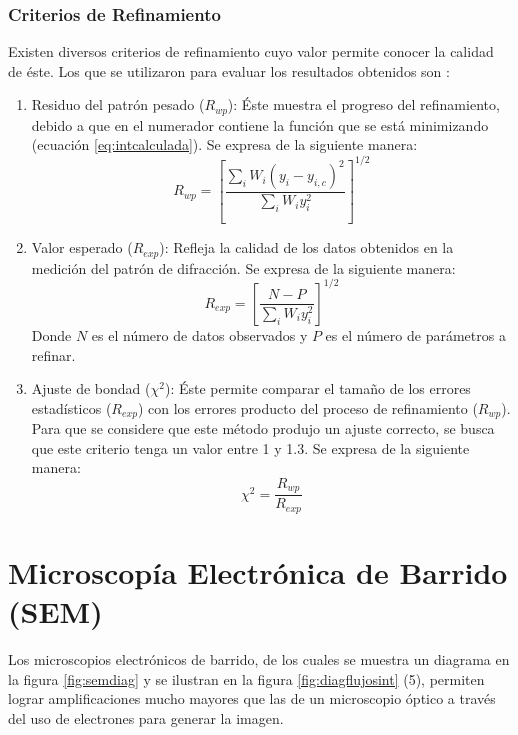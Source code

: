 \documentclass[../main.tex]{subfiles}
\begin{document}
\subsubsection{Criterios de Refinamiento} \label{sec:refinamiento}
Existen diversos criterios de refinamiento cuyo valor permite conocer la calidad de éste. Los que se utilizaron para evaluar los resultados obtenidos son \cite{Rietveld}:
\begin{enumerate}[label=\textbf{\alph*)}]
    \item Residuo del patrón pesado ($R_{wp}$): Éste muestra el progreso del refinamiento, debido a que en el numerador contiene la función que se está minimizando (ecuación \ref{eq:intcalculada}). Se expresa de la siguiente manera:
    \begin{equation}
        R_{wp}=\left[\dfrac{\sum_i W_i\left(y_i-y_{i,c}\right)^2}{\sum_i W_i y_i^2}\right]^{1/2}
        \label{eq:patronpesado}
    \end{equation}
    \item Valor esperado ($R_{exp}$): Refleja la calidad de los datos obtenidos en la medición del patrón de difracción. Se expresa de la siguiente manera:
    \begin{equation}
        R_{exp}=\left[\dfrac{N-P}{\sum_i W_i y_i^2}\right]^{1/2}
        \label{eq:valoresperado}
    \end{equation}
    Donde $N$ es el número de datos observados y $P$ es el número de parámetros a refinar.
    \item Ajuste de bondad ($\chi^2$): Éste permite comparar el tamaño de los errores estadísticos ($R_{exp}$) con los errores producto del proceso de refinamiento ($R_{wp}$). Para que se considere que este método produjo un ajuste correcto, se busca que este criterio tenga un valor entre 1 y 1.3. Se expresa de la siguiente manera:
    \begin{equation}
        \chi^2=\dfrac{R_{wp}}{R_{exp}}
        \label{eq:ajustebondad}
    \end{equation}
\end{enumerate}
\section{Microscopía Electrónica de Barrido (SEM)} \label{sec:metodologiaSEM}
Los microscopios electrónicos de barrido, de los cuales se muestra un diagrama en la figura \ref{fig:semdiag} y se ilustran en la figura \ref{fig:diagflujosint} (5), permiten lograr amplificaciones mucho mayores que las de un microscopio óptico a través del uso de electrones para generar la imagen.
\end{document}

